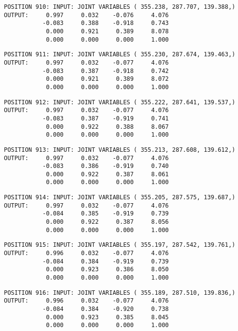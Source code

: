 \begin{verbatim}
POSITION 910: INPUT: JOINT VARIABLES ( 355.238, 287.707, 139.388,)
OUTPUT:     0.997     0.032    -0.076     4.076
           -0.083     0.388    -0.918     0.743
            0.000     0.921     0.389     8.078
            0.000     0.000     0.000     1.000
\end{verbatim} \pagebreak[1]\begin{verbatim}
POSITION 911: INPUT: JOINT VARIABLES ( 355.230, 287.674, 139.463,)
OUTPUT:     0.997     0.032    -0.077     4.076
           -0.083     0.387    -0.918     0.742
            0.000     0.921     0.389     8.072
            0.000     0.000     0.000     1.000
\end{verbatim} \pagebreak[1]\begin{verbatim}
POSITION 912: INPUT: JOINT VARIABLES ( 355.222, 287.641, 139.537,)
OUTPUT:     0.997     0.032    -0.077     4.076
           -0.083     0.387    -0.919     0.741
            0.000     0.922     0.388     8.067
            0.000     0.000     0.000     1.000
\end{verbatim} \pagebreak[1]\begin{verbatim}
POSITION 913: INPUT: JOINT VARIABLES ( 355.213, 287.608, 139.612,)
OUTPUT:     0.997     0.032    -0.077     4.076
           -0.083     0.386    -0.919     0.740
            0.000     0.922     0.387     8.061
            0.000     0.000     0.000     1.000
\end{verbatim} \pagebreak[1]\begin{verbatim}
POSITION 914: INPUT: JOINT VARIABLES ( 355.205, 287.575, 139.687,)
OUTPUT:     0.997     0.032    -0.077     4.076
           -0.084     0.385    -0.919     0.739
            0.000     0.922     0.387     8.056
            0.000     0.000     0.000     1.000
\end{verbatim} \pagebreak[1]\begin{verbatim}
POSITION 915: INPUT: JOINT VARIABLES ( 355.197, 287.542, 139.761,)
OUTPUT:     0.996     0.032    -0.077     4.076
           -0.084     0.384    -0.919     0.739
            0.000     0.923     0.386     8.050
            0.000     0.000     0.000     1.000
\end{verbatim} \pagebreak[1]\begin{verbatim}
POSITION 916: INPUT: JOINT VARIABLES ( 355.189, 287.510, 139.836,)
OUTPUT:     0.996     0.032    -0.077     4.076
           -0.084     0.384    -0.920     0.738
            0.000     0.923     0.385     8.045
            0.000     0.000     0.000     1.000
\end{verbatim} \pagebreak[1]\begin{verbatim}

\end{verbatim}
